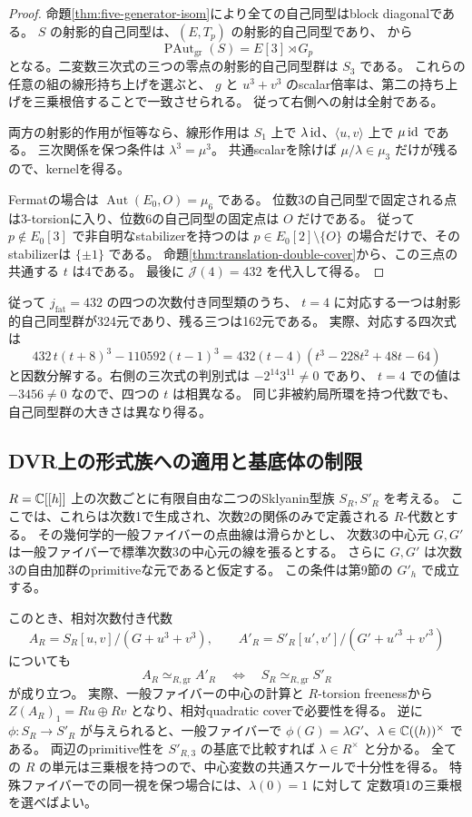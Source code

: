 \begin{proof}
命題\ref{thm:five-generator-isom}により全ての自己同型はblock diagonalである。
$S$ の射影的自己同型は、$(E,T_p)$ の射影的自己同型であり、
\cite[Theorem 4.12]{IMRelations}から
\[
 \operatorname{PAut}_{\mathrm{gr}}(S)=E[3]\rtimes G_p
\]
となる。二変数三次式の三つの零点の射影的自己同型群は $S_3$ である。
これらの任意の組の線形持ち上げを選ぶと、
$g$ と $u^3+v^3$ のscalar倍率は、第二の持ち上げを三乗根倍することで一致させられる。
従って右側への射は全射である。

両方の射影的作用が恒等なら、線形作用は
$S_1$ 上で $\lambda\operatorname{id}$、$\langle u,v\rangle$ 上で $\mu\operatorname{id}$ である。
三次関係を保つ条件は $\lambda^3=\mu^3$。
共通scalarを除けば $\mu/\lambda\in\mu_3$ だけが残るので、kernelを得る。

Fermatの場合は $\operatorname{Aut}(E_0,O)=\mu_6$ である。
位数3の自己同型で固定される点は3-torsionに入り、位数6の自己同型の固定点は $O$ だけである。
従って $p\notin E_0[3]$ で非自明なstabilizerを持つのは
$p\in E_0[2]\setminus\{O\}$ の場合だけで、そのstabilizerは $\{\pm1\}$ である。
命題\ref{thm:translation-double-cover}から、この三点の共通する $t$ は4である。
最後に $\mathcal J(4)=432$ を代入して得る。
\end{proof}

従って $j_{\mathrm{fat}}=432$ の四つの次数付き同型類のうち、
$t=4$ に対応する一つは射影的自己同型群が324元であり、残る三つは162元である。
実際、対応する四次式は
\[
 432\,t(t+8)^3-110592(t-1)^3
 =432(t-4)(t^3-228t^2+48t-64)
\]
と因数分解する。右側の三次式の判別式は $-2^{14}3^{11}\ne0$ であり、
$t=4$ での値は $-3456\ne0$ なので、四つの $t$ は相異なる。
同じ非被約局所環を持つ代数でも、自己同型群の大きさは異なり得る。

\subsection{DVR上の形式族への適用と基底体の制限}

$R=\mathbb C[[h]]$ 上の次数ごとに有限自由な二つのSklyanin型族 $S_R,S'_R$ を考える。
ここでは、これらは次数1で生成され、次数2の関係のみで定義される $R$-代数とする。
その幾何学的一般ファイバーの点曲線は滑らかとし、
次数3の中心元 $G,G'$ は一般ファイバーで標準次数3の中心元の線を張るとする。
さらに $G,G'$ は次数3の自由加群のprimitiveな元であると仮定する。
この条件は第9節の $G'_h$ で成立する。

このとき、相対次数付き代数
\[
 A_R=S_R[u,v]/(G+u^3+v^3),\qquad
 A'_R=S'_R[u',v']/(G'+u'^3+v'^3)
\]
についても
\[
 A_R\simeq_{R,\mathrm{gr}}A'_R
 \quad\Longleftrightarrow\quad
 S_R\simeq_{R,\mathrm{gr}}S'_R
\]
が成り立つ。
実際、一般ファイバーの中心の計算と $R$-torsion freenessから
$Z(A_R)_1=Ru\oplus Rv$ となり、相対quadratic coverで必要性を得る。
逆に $\phi:S_R\to S'_R$ が与えられると、一般ファイバーで
$\phi(G)=\lambda G'$、$\lambda\in\mathbb C((h))^\times$ である。
両辺のprimitive性を $S'_{R,3}$ の基底で比較すれば
$\lambda\in R^\times$ と分かる。
全ての $R$ の単元は三乗根を持つので、中心変数の共通スケールで十分性を得る。
特殊ファイバーでの同一視を保つ場合には、$\lambda(0)=1$ に対して
定数項1の三乗根を選べばよい。

